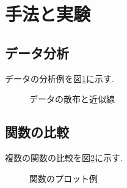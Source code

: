 \section{手法と実験}

\subsection{データ分析}

データの分析例を図\ref{fig:scatter}に示す.

\begin{figure}[H]
  \centering
  
  \caption{データの散布と近似線}
  \label{fig:scatter}
\end{figure}

\subsection{関数の比較}

複数の関数の比較を図\ref{fig:functions}に示す.

\begin{figure}[H]
  \centering
  
  \caption{関数のプロット例}
  \label{fig:functions}
\end{figure}


